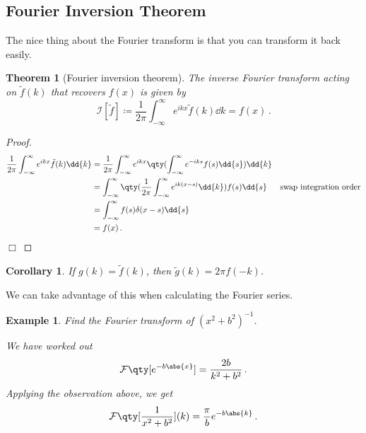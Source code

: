 \documentclass{article}
\theoremstyle{plain}\theoremheaderfont{\normalfont\itshape}\theorembodyfont{\rmfamily}\theoremseparator{.}\newtheorem*{rem}{Remark}\newtheorem*{ex}{Example}\newtheorem*{proof}{Proof}\newtheorem*{altp}{Alternative proof}
\theoremstyle{plain}\theoremheaderfont{\normalfont\bfseries}\theorembodyfont{\rmfamily}\theoremseparator{.}\newtheorem{thm}{Theorem}[section]\newtheorem{lem}[thm]{Lemma}\newtheorem{prop}[thm]{Proposition}\newtheorem*{cor}{Corollary}\newtheorem{defn}[thm]{Definition}\newtheorem{clm}[thm]{Claim}\newtheorem{clminproof}{Claim}
\theoremstyle{break}\theoremheaderfont{\normalfont\itshape}\theorembodyfont{\rmfamily}\theoremseparator{.\medskip}\newtheorem*{proofskip}{Proof}\newtheorem*{exs}{Examples}\newtheorem*{rems}{Remarks}
\theoremstyle{break}\theoremheaderfont{\normalfont\bfseries}\theorembodyfont{\rmfamily}\theoremseparator{.\medskip}\newtheorem{lemskip}[thm]{Lemma}\newtheorem{defnskip}[thm]{Definition}\newtheorem{propskip}[thm]{Proposition}\newtheorem{thmskip}[thm]{Theorem}
\numberwithin{equation}{section}
\newcommand{\qed}{\hfill\ensuremath{\Box}}
\begin{document}
	\subsection{Fourier Inversion Theorem}
	The nice thing about the Fourier transform is that you can transform it back easily.
	\begin{thm}[Fourier inversion theorem]
		The inverse Fourier transform acting on \(\tilde{f}(k)\) that recovers \(f(x)\) is given by
		\[\mathcal{I}[\tilde{f}]\coloneqq\frac{1}{2\pi}\int_{-\infty}^{\infty}e^{ikx}\tilde{f}(k)\dd{k}=f(x)\,.\]
	\end{thm}
	
	\begin{proof}
		\begin{align*}
			\frac{1}{2\pi}\int_{-\infty}^{\infty}e^{ikx}\tilde{f}(k)\dd{k}&=\frac{1}{2\pi}\int_{-\infty}^{\infty}e^{ikx}\qty(\int_{-\infty}^{\infty}e^{-iks}f(s)\dd{s})\dd{k}\\
			&=\int_{-\infty}^{\infty}\qty(\frac{1}{2\pi}\int_{-\infty}^{\infty}e^{ik(x-s)}\dd{k})f(s)\dd{s} & \text{swap integration order}\\
			&=\int_{-\infty}^{\infty}f(s)\delta(x-s)\dd{s}\\
			&=f(x)\,.
		\end{align*}\qed
	\end{proof}
	
	\begin{cor}
		If \(g(k)=\tilde{f}(k)\), then \(\tilde{g}(k)=2\pi f(-k)\).
	\end{cor}
	We can take advantage of this when calculating the Fourier series.
	\begin{ex}
		Find the Fourier transform of \((x^2+b^2)^{-1}\).

		We have worked out
		\[\mathcal{F}\qty[e^{-b\abs{x}}]=\frac{2b}{k^2+b^2}\,.\]
		Applying the observation above, we get
		\[\mathcal{F}\qty[\frac{1}{x^2+b^2}](k)=\frac{\pi}{b}e^{-b\abs{k}}\,.\]
	\end{ex}
	
\end{document}
